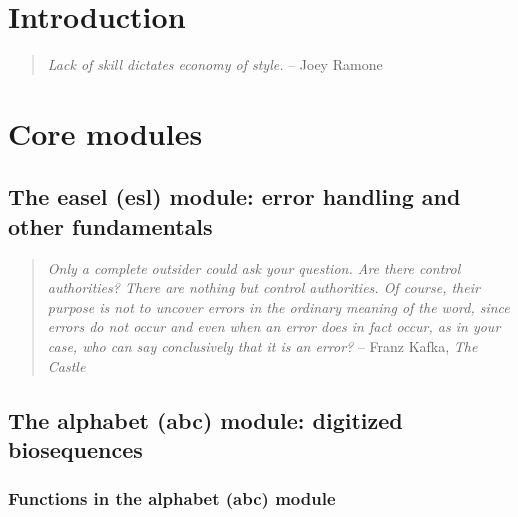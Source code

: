\documentclass[11pt]{book}
\begin{document}


\newpage
\tableofcontents

\newpage
\chapter{Introduction}


\vspace*{\fill}
\begin{quote}
\hspace*{1em}\hfill \emph{Lack of skill dictates economy of style.} \hspace{1em} -- Joey Ramone
\end{quote}     



\newpage
\chapter{Core modules}

\section{The easel (esl) module: error handling and other fundamentals}


\vspace*{\fill}
\begin{quote}
\emph{Only a complete outsider could ask your question. Are there
control authorities? There are nothing but control authorities. Of
course, their purpose is not to uncover errors in the ordinary meaning
of the word, since errors do not occur and even when an error does in
fact occur, as in your case, who can say conclusively that it is an
error?} \hspace{3em} -- Franz Kafka, \emph{The Castle}
\end{quote}     

\newpage
\section{The alphabet (abc) module: digitized biosequences}

\subsection{Functions in the alphabet (abc) module}

\end{document}
